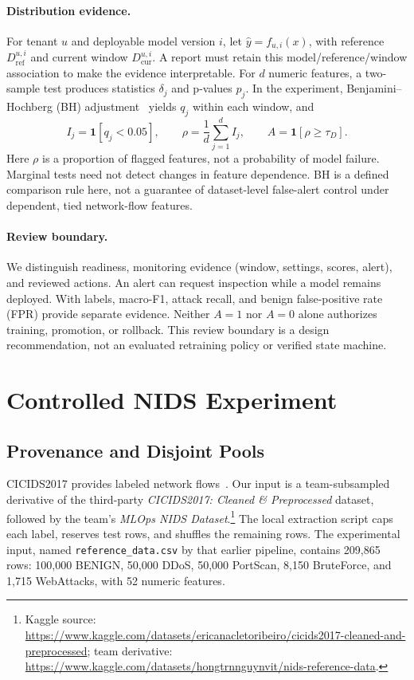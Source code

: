 \documentclass[runningheads]{llncs}
\begin{document}
\paragraph{Distribution evidence.}
For tenant $u$ and deployable model version $i$, let $\hat y=f_{u,i}(x)$, with reference $D_{\mathrm{ref}}^{u,i}$ and current window $D_{\mathrm{cur}}^{u,i}$. A report must retain this model/reference/window association to make the evidence interpretable. For $d$ numeric features, a two-sample test produces statistics $\delta_j$ and p-values $p_j$. In the experiment, Benjamini--Hochberg (BH) adjustment~\cite{bh1995} yields $q_j$ within each window, and
\begin{equation}
I_j=\mathbf{1}[q_j<0.05],\qquad
\rho=\frac{1}{d}\sum_{j=1}^{d}I_j,\qquad
A=\mathbf{1}[\rho\geq\tau_D].
\label{eq:drift}
\end{equation}
Here $\rho$ is a proportion of flagged features, not a probability of model failure. Marginal tests need not detect changes in feature dependence. BH is a defined comparison rule here, not a guarantee of dataset-level false-alert control under dependent, tied network-flow features.

\paragraph{Review boundary.}
We distinguish readiness, monitoring evidence (window, settings, scores, alert), and reviewed actions. An alert can request inspection while a model remains deployed. With labels, macro-F1, attack recall, and benign false-positive rate (FPR) provide separate evidence. Neither $A=1$ nor $A=0$ alone authorizes training, promotion, or rollback. This review boundary is a design recommendation, not an evaluated retraining policy or verified state machine.

\section{Controlled NIDS Experiment}
\label{sec:protocol}
\subsection{Provenance and Disjoint Pools}
CICIDS2017 provides labeled network flows~\cite{cicids}. Our input is a team-subsampled derivative of the third-party \emph{CICIDS2017: Cleaned \& Preprocessed} dataset, followed by the team's \emph{MLOps NIDS Dataset}.\footnote{\raggedright Kaggle source: \url{https://www.kaggle.com/datasets/ericanacletoribeiro/cicids2017-cleaned-and-preprocessed}; team derivative: \url{https://www.kaggle.com/datasets/hongtrnnguynvit/nids-reference-data}.} The local extraction script caps each label, reserves test rows, and shuffles the remaining rows. The experimental input, named \texttt{reference\_data.csv} by that earlier pipeline, contains 209,865 rows: 100,000 BENIGN, 50,000 DDoS, 50,000 PortScan, 8,150 BruteForce, and 1,715 WebAttacks, with 52 numeric features.
\end{document}
